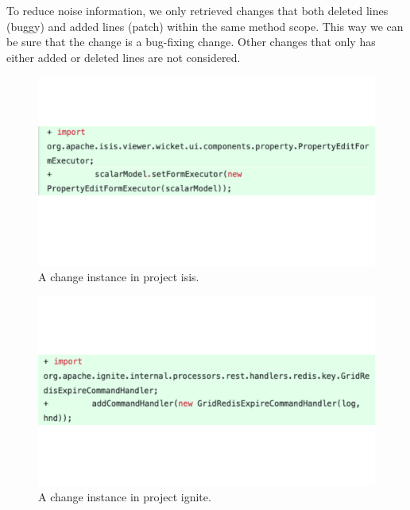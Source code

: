 To reduce noise information, we only retrieved changes that both deleted lines (buggy) and added lines (patch) within the same method scope.
This way we can be sure that the change is a bug-fixing change. 
Other changes that only has either added or deleted lines are not considered.


\begin{figure}[!ht]
    \renewcommand{\arraystretch}{1}
    \centering
    \includegraphics[width=\linewidth]{figures/cbcv-1.pdf}\hfill
    \caption{A change instance in project isis.}
    \label{fig:cbcv_1}
\end{figure}
    
\begin{figure}[!ht]
    \renewcommand{\arraystretch}{1}
    \centering
    \includegraphics[width=\linewidth]{figures/cbcv-2.pdf}\hfill
    \caption{A change instance in project ignite.}
    \label{fig:cbcv_2}
\end{figure}

